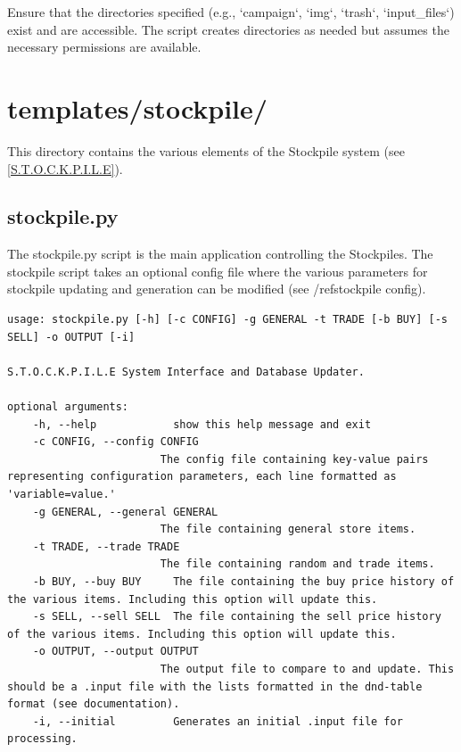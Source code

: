 Ensure that the directories specified (e.g., `campaign`, `img`, `trash`, `input_files`) exist and are accessible. The script creates directories as needed but assumes the necessary permissions are available.

















\section{templates/stockpile/}

This directory contains the various elements of the Stockpile system (see \ref{S.T.O.C.K.P.I.L.E}).

\subsection{stockpile.py}

The stockpile.py script is the main application controlling the Stockpiles. The stockpile script takes an optional config file where the various parameters for stockpile updating and generation can be modified (see /ref{stockpile config}).

\begin{lstlisting}
usage: stockpile.py [-h] [-c CONFIG] -g GENERAL -t TRADE [-b BUY] [-s SELL] -o OUTPUT [-i]

S.T.O.C.K.P.I.L.E System Interface and Database Updater.

optional arguments:
	-h, --help            show this help message and exit
	-c CONFIG, --config CONFIG
	                    The config file containing key-value pairs representing configuration parameters, each line formatted as 'variable=value.'
	-g GENERAL, --general GENERAL
	                    The file containing general store items.
	-t TRADE, --trade TRADE
	                    The file containing random and trade items.
	-b BUY, --buy BUY     The file containing the buy price history of the various items. Including this option will update this.
	-s SELL, --sell SELL  The file containing the sell price history of the various items. Including this option will update this.
	-o OUTPUT, --output OUTPUT
	                    The output file to compare to and update. This should be a .input file with the lists formatted in the dnd-table format (see documentation).
	-i, --initial         Generates an initial .input file for processing.
\end{lstlisting}

